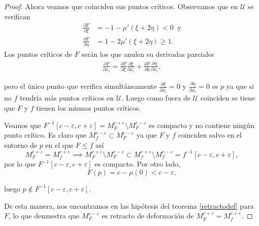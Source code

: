 \begin{proof}
    \medskip

    Ahora veamos que coinciden sus puntos críticos. Observamos que en $\mathcal{U}$ se verifican
    \begin{align*}
        \frac{\partial F}{\partial \xi}&=-1-\mu'(\xi + 2\eta)<0 ~\text{ y}\\
        \frac{\partial F}{\partial \eta}&=1-2\mu'(\xi+2\eta)\ge 1.
    \end{align*}
    Los puntos críticos de $F$ serán los que anulen su derivadas parciales
    \begin{align*}
        \frac{\partial F}{\partial x_i}=\frac{\partial F}{\partial \xi}\frac{\partial \xi}{\partial x_i} + \frac{\partial F}{\partial \eta}\frac{\partial \eta}{\partial x_i},
    \end{align*}

    pero el único punto que verifica simultáneamente $\frac{\partial \xi}{\partial x_i}=0$ y $\frac{\partial \eta}{\partial x_i}=0$ es $p$ ya que si no $f$ tendría más puntos críticos en $\mathcal{U}$. Luego como fuera de $\mathcal{U}$ coinciden se tiene que  $F$ y $f$ tienen los mismos puntos críticos.

    \medskip

    Veamos que $F^{-1}[c-\varepsilon,c+\varepsilon]=M^{c+\varepsilon}_F\setminus M^{c-\varepsilon}_F$ es compacto y no contiene ningún punto crítico. Es claro que $M^{c-\varepsilon}_f\subset M^{c-\varepsilon}_F$ ya que $F$ y $f$ coinciden salvo en el entorno de $p$ en el que $F\le f$ así
    \begin{equation*}
        M^{c+\varepsilon}_F=M^{c+\varepsilon}_f\implies M^{c+\varepsilon}_F\setminus M^{c-\varepsilon}_F \subset M^{c+\varepsilon}_f\setminus M^{c-\varepsilon}_f=f^{-1}[c-\varepsilon,c+\varepsilon],
    \end{equation*}
    por lo que $F^{-1}[c-\varepsilon,c+\varepsilon]$ es compacto. Por otro lado,
    \begin{equation*}
        F(p)=c-\mu(0)<c-\varepsilon,
    \end{equation*}

    luego $p\notin F^{-1}[c-\varepsilon,c+\varepsilon]$.

    \medskip

    De esta manera, nos encontramos en las hipótesis del teorema \ref{retractodef} para $F$, lo que demuestra que $M^{c-\varepsilon}_F$ es retracto de deformación de $M^{c+\varepsilon}_F=M^{c+\varepsilon}_f$.

    \bigskip


\end{proof}
